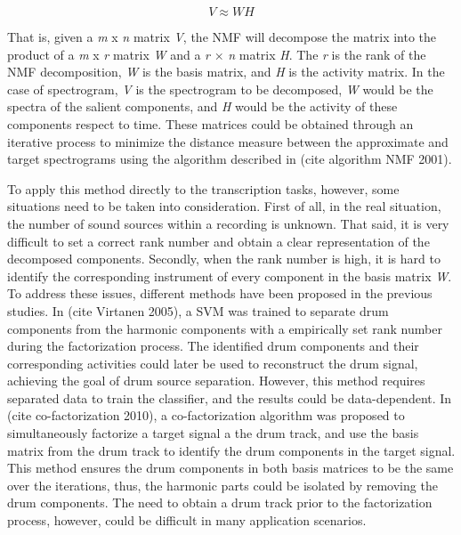 \documentclass{article}
\begin{document}
\begin{equation}
V \approx WH
\label{eq:approx}
\end{equation}

That is, given a {\itshape m} x {\itshape n} matrix {\itshape V}, the NMF will decompose the matrix into the product of a {\itshape m} x {\itshape r} matrix {\itshape W} and a {\itshape r} × {\itshape n} matrix {\itshape H}. The {\itshape r} is the rank of the NMF decomposition, {\itshape W} is the basis matrix, and {\itshape H} is the activity matrix. In the case of spectrogram, {\itshape V} is the spectrogram to be decomposed, {\itshape W} would be the spectra of the salient components, and {\itshape H} would be the activity of these components respect to time. These matrices could be obtained through an iterative process to minimize the distance measure between the approximate and target spectrograms using the algorithm described in (cite algorithm NMF 2001). 

To apply this method directly to the transcription tasks, however, some situations need to be taken into consideration. First of all, in the real situation, the number of sound sources within a recording is unknown. That said, it is very difficult to set a correct rank number and obtain a clear representation of the decomposed  components. Secondly, when the rank number is high, it is hard to identify the corresponding instrument of every component in the basis matrix {\itshape W}. To address these issues, different methods have been proposed in the previous studies. In (cite Virtanen 2005), a SVM was trained to separate drum components from the harmonic components with a empirically set rank number during the factorization process. The identified drum components and their corresponding activities could later be used to reconstruct the drum signal, achieving the goal of drum source separation. However, this method requires separated data to train the classifier, and the results could be data-dependent. In (cite co-factorization 2010), a co-factorization algorithm was proposed to simultaneously factorize a target signal a the drum track, and use the basis matrix from the drum track to identify the drum components in the target signal. This method ensures the drum components in both basis matrices to be the same over the iterations, thus, the harmonic parts could be isolated by removing the drum components. The need to obtain a drum track prior to the factorization process, however, could be difficult in many application scenarios.
\end{document}
